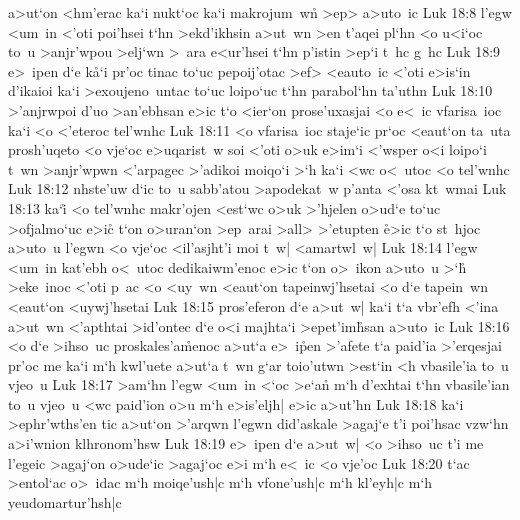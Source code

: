 a>ut`on
<hm'erac
ka`i
nukt`oc
ka`i
makrojum~w\r{n}
>ep>
a>uto~ic\bibvsend
\vs Luk 18:8
l'egw
<um~in
<'oti
poi'hsei
t`hn
>ekd'ikhsin
a>ut~wn
>en
t'aqei
pl`hn
<o
u<i`oc
to~u
>anjr'wpou
>elj`wn
>~ara
e<ur'hsei
t`hn
p'istin
>ep`i
t~hc
g~hc\bibvsend
\vs Luk 18:9
e>~ipen
d`e
k\r{a}`i
pr'oc
tinac
to`uc
pepoij'otac
>ef>
<eauto~ic
<'oti
e>is`in
d'ikaioi
ka`i
>exoujeno~untac
to`uc
loipo`uc
t`hn
parabol`hn
ta'uthn\bibvsend
\vs Luk 18:10
>'anjrwpoi
d'uo
>an'ebhsan
e>ic
t`o
<ier`on
prose'uxasjai
<o
e<~ic
vfarisa~ioc
ka`i
<o
<'eteroc
tel'wnhc\bibvsend
\vs Luk 18:11
<o
vfarisa~ioc
staje`ic
pr`oc
<eaut`on
ta~uta
prosh'uqeto
<o
vje`oc
e>uqarist~w
soi
<'oti
o>uk
e>im`i
<'wsper
o<i
loipo`i
t~wn
>anjr'wpwn
<'arpagec
>'adikoi
moiqo`i
>`h
ka`i
<wc
o<~utoc
<o
tel'wnhc\bibvsend
\vs Luk 18:12
nhste'uw
d`ic
to~u
sabb'atou
>apodekat~w
p'anta
<'osa
kt~wmai\bibvsend
\vs Luk 18:13
ka`i\r{}
<o
tel'wnhc
makr'ojen
<est`wc
o>uk
>'hjelen
o>ud`e
to`uc
>ofjalmo`uc
e>ic\r{}
t`on
o>uran`on
>ep~arai
>all>
>'etupten
\r{e}>ic
t`o
st~hjoc
a>uto~u
l'egwn
<o
vje`oc
<il'asjht'i
moi
t~w|
<amartwl~w|\bibvsend
\vs Luk 18:14
l'egw
<um~in
kat'ebh
o<~utoc
dedikaiwm'enoc
e>ic
t`on
o>~ikon
a>uto~u
>`h\r{}
>eke~inoc
<'oti
p~ac
<o
<uy~wn
<eaut`on
tapeinwj'hsetai
<o
d`e
tapein~wn
<eaut`on
<uywj'hsetai\bibvsend
\vs Luk 18:15
pros'eferon
d`e
a>ut~w|
ka`i
t`a
vbr'efh
<'ina
a>ut~wn
<'apthtai
>id'ontec
d`e
o<i
majhta`i
>epet'im\r{h}san
a>uto~ic\bibvsend
\vs Luk 18:16
<o
d`e
>ihso~uc
proskales'a\r{m}enoc
a>ut`a
e>~i\r{p}en
>'afete
t`a
paid'ia
>'erqesjai
pr'oc
me
ka`i
m`h
kwl'uete
a>ut`a
t~wn
g`ar
toio'utwn
>est`in
<h
vbasile'ia
to~u
vjeo~u\bibvsend
\vs Luk 18:17
>am`hn
l'egw
<um~in
<`oc
>e`a\r{n}
m`h
d'exhtai
t`hn
vbasile'ian
to~u
vjeo~u
<wc
paid'ion
o>u
m`h
e>is'eljh|
e>ic
a>ut'hn\bibvsend
\vs Luk 18:18
ka`i
>ephr'wths'en
tic
a>ut`on
>'arqwn
l'egwn
did'askale
>agaj`e
t'i
poi'hsac
vzw`hn
a>i'wnion
klhronom'hsw\bibvsend
\vs Luk 18:19
e>~ipen
d`e
a>ut~w|
<o
>ihso~uc
t'i
me
l'egeic
>agaj`on
o>ude`ic
>agaj`oc
e>i
m`h
e<~ic
<o
vje'oc\bibvsend
\vs Luk 18:20
t`ac
>entol`ac
o>~idac
m`h
moiqe'ush|c
m`h
vfone'ush|c
m`h
kl'eyh|c
m`h
yeudomartur'hsh|c

